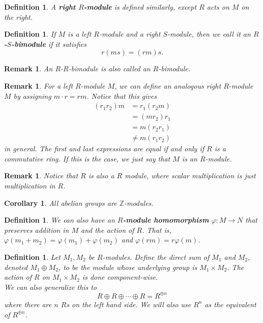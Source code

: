 \documentclass{article}
\theoremstyle{norm}
\newtheorem{df}[thm]{Definition}
\newtheorem{rem}[thm]{Remark}
\newtheorem{cor}[thm]{Corollary}
\begin{document}
\begin{df}
A \textbf{right $R$-module} is defined similarly, except $R$ acts on $M$
on the right.
\end{df}

\begin{df}
If $M$ is a left $R$-module and a right $S$-module, then we call it an
\textbf{$R$-$S$-bimodule} if it satisfies
\[ r\left(ms\right) = \left(rm\right)s. \]
\end{df}
\begin{rem}
An $R$-$R$-bimodule is also called an $R$-bimodule.
\end{rem}

\begin{rem}
For a left $R$-module $M$, we can define an analogous right $R$-module
$M$ by assigning $m \cdot r = rm$. Notice that this gives
\[ \begin{aligned}
\left(r_1 r_2\right) m &= r_1 \left(r_2 m\right) \\
&= \left(m r_2\right) r_1 \\
&= m \left(r_2 r_1\right) \\
&\neq m \left(r_1 r_2\right)
\end{aligned} \]
in general. The first and last expressions are equal if and only if $R$
is a commutative ring. If this is the case, we just say that $M$ is an
$R$-module.
\end{rem}
\begin{rem}
Notice that $R$ is also a $R$ module, where scalar multiplication is
just multiplication in $R$.
\end{rem}

\begin{cor}
All abelian groups are $\mathbb{Z}$-modules.
\end{cor}

\begin{df}
We can also have an \textbf{$R$-module homomorphism} $\varphi : M
\rightarrow N$ that preserves addition in $M$ and the action of $R$.
That is, $\varphi(m_1 + m_2) = \varphi(m_1) + \varphi(m_2)$ and
$\varphi(rm) = r \varphi(m)$.
\end{df}

\begin{df}
Let $M_1, M_2$ be $R$-modules. Define the direct sum of $M_1$ and $M_2$,
denoted $M_1 \oplus M_2$, to be the module whose underlying group is
$M_1 \times M_2$. The action of $R$ on $M_1 \times M_2$ is done
component-wise. \\
We can also generalize this to
\[ R \oplus R \oplus \cdots \oplus R = R^{\oplus n} \]
where there are $n$ $R$s on the left hand side. We will also use $R^n$
as the equivalent of $R^{\oplus n}$.
\end{df}
\end{document}
